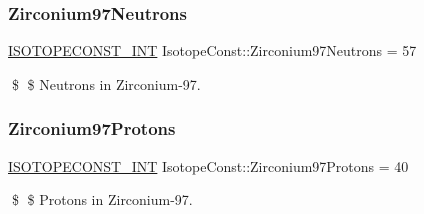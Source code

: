 \subsubsection{\texorpdfstring{Zirconium97\+Neutrons}{Zirconium97Neutrons}}
{\footnotesize\ttfamily \mbox{\hyperlink{group___isotope_const-_macros_ga5f18360b3e99483a35c32d789e62621c}{I\+S\+O\+T\+O\+P\+E\+C\+O\+N\+S\+T\+\_\+\+I\+NT}} Isotope\+Const\+::\+Zirconium97\+Neutrons = 57}

\$ \$ Neutrons in Zirconium-\/97. \mbox{\label{group___isotope_const-_zirconium-_zr97_gaa7949221ea86aa62b599b7daee0403a0}} 
\subsubsection{\texorpdfstring{Zirconium97\+Protons}{Zirconium97Protons}}
{\footnotesize\ttfamily \mbox{\hyperlink{group___isotope_const-_macros_ga5f18360b3e99483a35c32d789e62621c}{I\+S\+O\+T\+O\+P\+E\+C\+O\+N\+S\+T\+\_\+\+I\+NT}} Isotope\+Const\+::\+Zirconium97\+Protons = 40}

\$ \$ Protons in Zirconium-\/97. 